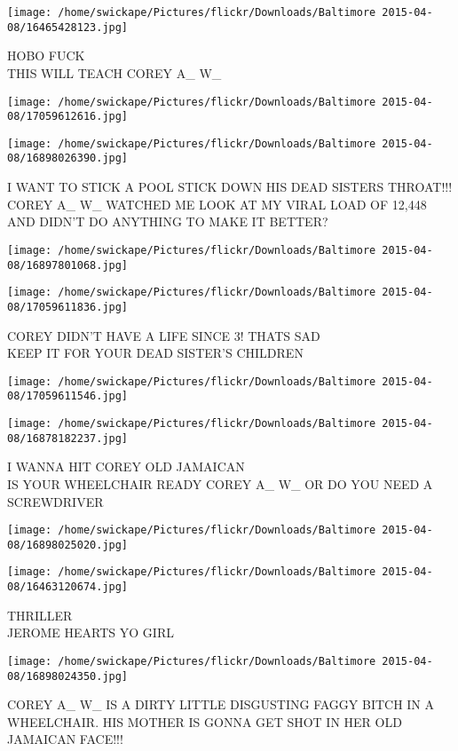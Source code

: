 \documentclass[10pt,letterpaper]{article}
\begin{document}
\vspace{0.25in}
\texttt{[image: /home/swickape/Pictures/flickr/Downloads/Baltimore 2015-04-08/16465428123.jpg]}

HOBO FUCK\\
THIS WILL TEACH COREY A\_ W\_
\pagebreak

\texttt{[image: /home/swickape/Pictures/flickr/Downloads/Baltimore 2015-04-08/17059612616.jpg]}

\vspace{0.25in}
\texttt{[image: /home/swickape/Pictures/flickr/Downloads/Baltimore 2015-04-08/16898026390.jpg]}

I WANT TO STICK A POOL STICK DOWN HIS DEAD SISTERS THROAT!!!\\
COREY A\_ W\_ WATCHED ME LOOK AT MY VIRAL LOAD OF 12,448 AND DIDN'T DO ANYTHING TO MAKE IT BETTER?
\pagebreak

\texttt{[image: /home/swickape/Pictures/flickr/Downloads/Baltimore 2015-04-08/16897801068.jpg]}

\vspace{0.25in}
\texttt{[image: /home/swickape/Pictures/flickr/Downloads/Baltimore 2015-04-08/17059611836.jpg]}

COREY DIDN'T HAVE A LIFE SINCE 3!  THATS SAD\\
KEEP IT FOR YOUR DEAD SISTER'S CHILDREN
\pagebreak

\texttt{[image: /home/swickape/Pictures/flickr/Downloads/Baltimore 2015-04-08/17059611546.jpg]}

\vspace{0.25in}
\texttt{[image: /home/swickape/Pictures/flickr/Downloads/Baltimore 2015-04-08/16878182237.jpg]}

I WANNA HIT COREY OLD JAMAICAN\\
IS YOUR WHEELCHAIR READY COREY A\_ W\_ OR DO YOU NEED A SCREWDRIVER
\pagebreak

\texttt{[image: /home/swickape/Pictures/flickr/Downloads/Baltimore 2015-04-08/16898025020.jpg]}

\vspace{0.25in}
\texttt{[image: /home/swickape/Pictures/flickr/Downloads/Baltimore 2015-04-08/16463120674.jpg]}

THRILLER\\
JEROME HEARTS YO GIRL
\pagebreak

\texttt{[image: /home/swickape/Pictures/flickr/Downloads/Baltimore 2015-04-08/16898024350.jpg]}

COREY A\_ W\_ IS A DIRTY LITTLE DISGUSTING FAGGY BITCH IN A WHEELCHAIR.  HIS MOTHER IS GONNA GET SHOT IN HER OLD JAMAICAN FACE!!!
\pagebreak
\end{document}
